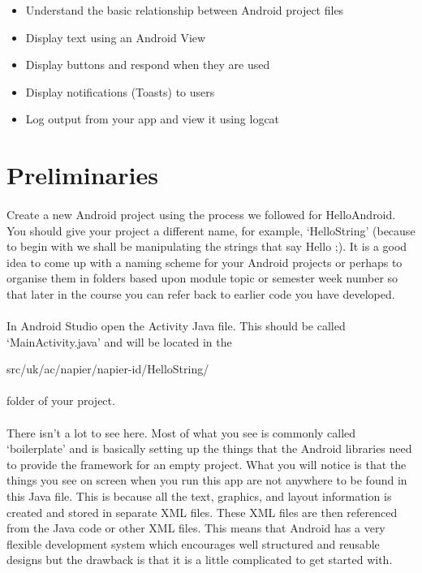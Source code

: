 \documentclass[12pt, a4paper, twoside]{book}
\begin{document}
\begin{itemize}
\item Understand the basic relationship between Android project files
\item Display text using an Android View
\item Display buttons and respond when they are used
\item Display notifications (Toasts) to users
\item Log output from your app and view it using logcat
\end{itemize}

\section{Preliminaries}
\paragraph{} Create a new Android project using the process we followed for HelloAndroid. You should give your project a different name, for example, `HelloString' (because to begin with we shall be manipulating the strings that say Hello ;). It is a good idea to come up with a naming scheme for your Android projects or perhaps to organise them in folders based upon module topic or semester week number so that later in the course you can refer back to earlier code you have developed.

\paragraph{} In Android Studio open the Activity Java file. This should be called `MainActivity.java' and will be located in the 
\begin{framed}
src/uk/ac/napier/napier-id/HelloString/ 
\end{framed}
\paragraph{} folder of your project. 

\paragraph{} There isn’t a lot to see here. Most of what you see is commonly called `boilerplate' and is basically setting up the things that the Android libraries need to provide the framework for an empty project. What you will notice is that the things you see on screen when you run this app are not anywhere to be found in this Java file. This is because all the text, graphics, and layout information is created and stored in separate XML files. These XML files are then referenced from the Java code or other XML files. This means that Android has a very flexible development system which encourages well structured and reusable designs but the drawback is that it is a little complicated to get started with.
\end{document}
